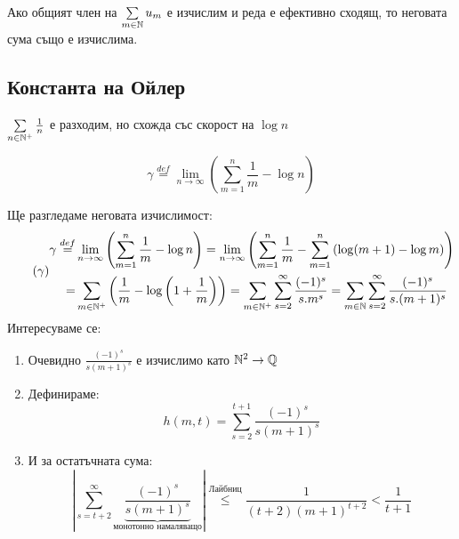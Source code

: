 \begin{corollary}
    Ако общият член на $\sum\limits_{m\in {\mathbb{N}}} u_m$ е изчислим и реда е ефективно сходящ, то неговата сума също е изчислима.
\end{corollary}

\subsection{Константа на Ойлер}
\begin{fact}
    $\sum\limits_{n \in {\mathbb{N}}^+} \frac{1}{n}$ е разходим, но схожда със скорост на $\log n$    
\end{fact}
\begin{definition}
    \begin{equation}
         \gamma \overset{def}{=} \lim\limits_{n\to\infty}\left( \sum\limits_{m=1}^n \frac{1}{m} - \log n \right)
    \end{equation}
\end{definition}

Ще разгледаме неговата изчислимост:
\begin{equation} \tag{$\gamma$}
    \begin{split}
        \gamma \overset{def}{=} & \lim\limits_{n\to\infty}\left( \sum\limits_{m=1}^n \frac{1}{m} - \log n \right) = \lim\limits_{n\to\infty} \left( \sum\limits_{m=1}^n \frac{1}{m} - \sum\limits_{m=1}^n \left( \log(m+1) - \log m \right) \right) \\
        = &  \sum\limits_{m\in{\mathbb{N}}^+} \left( \frac{1}{m} - \log\left(1+\frac{1}{m}\right) \right) = \sum\limits_{m\in{\mathbb{N}}^+} \sum\limits_{s = 2}^\infty \frac{(-1)^s}{s.m^s} = \sum\limits_{m\in{\mathbb{N}}} \sum\limits_{s = 2}^\infty \frac{(-1)^s}{s.(m+1)^s}
    \end{split}
\end{equation}
Интересуваме се:
\begin{enumerate}
    \item Очевидно $\frac{(-1)^s}{s(m+1)^s}$ е изчислимо като ${\mathbb{N}}^2 \to {\mathbb{Q}}$
    \item Дефинираме:
    \begin{equation*}
        h(m, t) = \sum\limits_{s=2}^{t+1} \frac{(-1)^s}{s(m+1)^s}
    \end{equation*}
    \item И за остатъчната сума:
    \begin{equation*}
        \left| \sum\limits_{s=t+2}^\infty \underbrace{\frac{(-1)^s}{s(m+1)^s}}_{\text{монотонно намаляващо}} \right| \overset{\text{Лайбниц}}{\leq} \frac{1}{(t+2)(m+1)^{t+2}} < \frac{1}{t+1}
    \end{equation*}
\end{enumerate}

